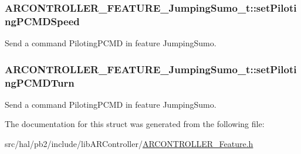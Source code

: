 \subsubsection[{\texorpdfstring{set\+Piloting\+P\+C\+M\+D\+Speed}{setPilotingPCMDSpeed}}]{ A\+R\+C\+O\+N\+T\+R\+O\+L\+L\+E\+R\+\_\+\+F\+E\+A\+T\+U\+R\+E\+\_\+\+Jumping\+Sumo\+\_\+t\+::set\+Piloting\+P\+C\+M\+D\+Speed}\hypertarget{struct_a_r_c_o_n_t_r_o_l_l_e_r___f_e_a_t_u_r_e___jumping_sumo__t_a3f09e080467e6d4542f57adae107e668}{}\label{struct_a_r_c_o_n_t_r_o_l_l_e_r___f_e_a_t_u_r_e___jumping_sumo__t_a3f09e080467e6d4542f57adae107e668}
Send a command {\ttfamily Piloting\+P\+C\+MD} in feature {\ttfamily Jumping\+Sumo}. 
\subsubsection[{\texorpdfstring{set\+Piloting\+P\+C\+M\+D\+Turn}{setPilotingPCMDTurn}}]{ A\+R\+C\+O\+N\+T\+R\+O\+L\+L\+E\+R\+\_\+\+F\+E\+A\+T\+U\+R\+E\+\_\+\+Jumping\+Sumo\+\_\+t\+::set\+Piloting\+P\+C\+M\+D\+Turn}\hypertarget{struct_a_r_c_o_n_t_r_o_l_l_e_r___f_e_a_t_u_r_e___jumping_sumo__t_a32f01cd700aa93a416b7411ac5ed7049}{}\label{struct_a_r_c_o_n_t_r_o_l_l_e_r___f_e_a_t_u_r_e___jumping_sumo__t_a32f01cd700aa93a416b7411ac5ed7049}
Send a command {\ttfamily Piloting\+P\+C\+MD} in feature {\ttfamily Jumping\+Sumo}. 

The documentation for this struct was generated from the following file\+:\begin{DoxyCompactItemize}
\item 
src/hal/pb2/include/lib\+A\+R\+Controller/\hyperlink{_a_r_c_o_n_t_r_o_l_l_e_r___feature_8h}{A\+R\+C\+O\+N\+T\+R\+O\+L\+L\+E\+R\+\_\+\+Feature.\+h}\end{DoxyCompactItemize}
